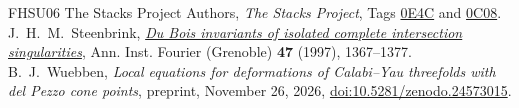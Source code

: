 \begin{thebibliography}{FHSU06}
 The Stacks Project Authors, \emph{The Stacks Project}, Tags \href{https://stacks.math.columbia.edu/tag/0E4C}{0E4C} and \href{https://stacks.math.columbia.edu/tag/0C08}{0C08}.
 J.~H.~M.~Steenbrink, \href{https://doi.org/10.5802/aif.1603}{\emph{Du Bois invariants of isolated complete intersection singularities}}, Ann. Inst. Fourier (Grenoble) \textbf{47} (1997), 1367--1377.
 B.~J.~Wuebben, \emph{Local equations for deformations of Calabi--Yau threefolds with del Pezzo cone points}, preprint, November 26, 2026, \href{https://doi.org/10.5281/zenodo.24573015}{doi:10.5281/zenodo.24573015}.
\end{thebibliography}
